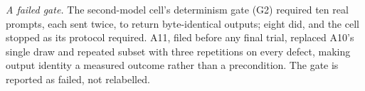 \emph{A failed gate.} The second-model cell's determinism gate (G2) required
ten real prompts, each sent twice, to return byte-identical outputs; eight
did, and the cell stopped as its protocol required. A11, filed before any final
trial, replaced A10's single draw and repeated subset with three repetitions
on every defect, making output identity a measured outcome rather than a
precondition. The gate is reported as failed, not relabelled.
